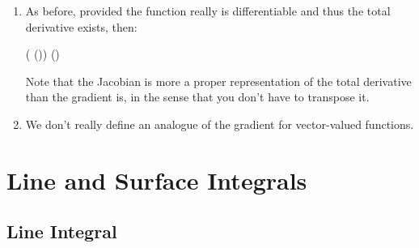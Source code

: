 \documentclass[11pt, oneside]{amsart}
\newcommand{\opD}{\operatorname{D}}
\begin{document}
\begin{enumerate}
\noindent
Here, $\mtx{F}(\vx)_i$ just means the restriction of the value of
$\mtx{F}$ to the $i$th-coordinate. $\gradient\tran \mtx{F}(\vx)_i$ is
effectively the representation of the linear functional
$\opD_{\mtx{F}_i}(\vx)$.

For $\mtxF : \R^m \to \R^n$, $\mJ_{\mtx{F}}(\vx)$ is an $n$-by-$m$
matrix. It maps vectors of $\R^m$ to the vector-valued directional
derivative along that vector.

\item As before, provided the function really is differentiable and thus
the total derivative exists, then:

\begin{nedqn}
  (\opD {} (\vx)) \vv
\eqcol
  \mJ(\vx) \vv
\end{nedqn}

\noindent
Note that the Jacobian is more a proper representation of the total
derivative than the gradient is, in the sense that you don't have to
transpose it.

\item We don't really define an analogue of the gradient for
vector-valued functions.

\end{enumerate}

\section{Line and Surface Integrals}

\subsection{Line Integral}
\end{document}
